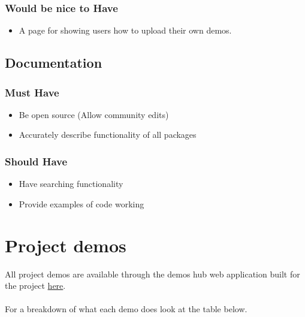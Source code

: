 \documentclass{l4proj}
\begin{document}
\begin{appendices}
\subsection{Would be nice to Have}
\begin{itemize}
    \item A page for showing users how to upload their own demos.
\end{itemize}


\section{Documentation}
\subsection{Must Have}
\begin{itemize}
    \item Be open source (Allow community edits)
    \item Accurately describe functionality of all packages
\end{itemize}
\subsection{Should Have}
\begin{itemize}
    \item Have searching functionality
    \item Provide examples of code working
\end{itemize}

\chapter{Project demos}



\label{appendix:projdemos}
All project demos are available through the demos hub web application built for the project \href{https://demos-mu.vercel.app}{here}.
\\ \\
For a breakdown of what each demo does look at the table below.



\end{appendices}
\end{document}
